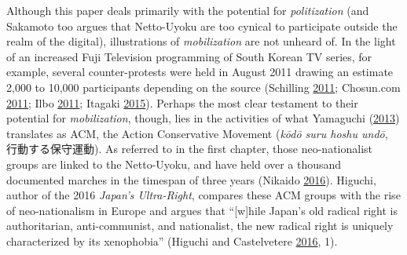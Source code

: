 \documentclass[10pt,british,A4paper,,openany]{memoir}
\begin{document}
Although this paper deals primarily with the potential for
\emph{politization} (and Sakamoto too argues that Netto-Uyoku are too
cynical to participate outside the realm of the digital), illustrations
of \emph{mobilization} are not unheard of. In the light of an increased
Fuji Television programming of South Korean TV series, for example,
several counter-protests were held in August 2011 drawing an estimate
2,000 to 10,000 participants depending on the source (Schilling
\protect\hyperlink{ref-schilling_japanese_2011}{2011}; Chosun.com
\protect\hyperlink{ref-chosun.com_japanese_2011}{2011}; Ilbo
\protect\hyperlink{ref-the_donga_ilbo_japans_2011}{2011}; Itagaki
\protect\hyperlink{ref-itagaki_anatomy_2015}{2015}). Perhaps the most
clear testament to their potential for \emph{mobilization}, though, lies
in the activities of what Yamaguchi
(\protect\hyperlink{ref-yamaguchi_xenophobia_2013}{2013}) translates as
ACM, the Action Conservative Movement (\emph{kōdō suru hoshu undō},
行動する保守運動). As referred to in the first chapter, those
neo-nationalist groups are linked to the Netto-Uyoku, and have held over
a thousand documented marches in the timespan of three years (Nikaido
\protect\hyperlink{ref-nikaido_eng:_2016}{2016}). Higuchi, author of the
2016 \emph{Japan's Ultra-Right}, compares these ACM groups with the rise
of neo-nationalism in Europe and argues that ``{[}w{]}hile Japan's old
radical right is authoritarian, anti-communist, and nationalist, the new
radical right is uniquely characterized by its xenophobia'' (Higuchi and
Castelvetere \protect\hyperlink{ref-higuchi_japans_2016}{2016}, 1).
\end{document}
